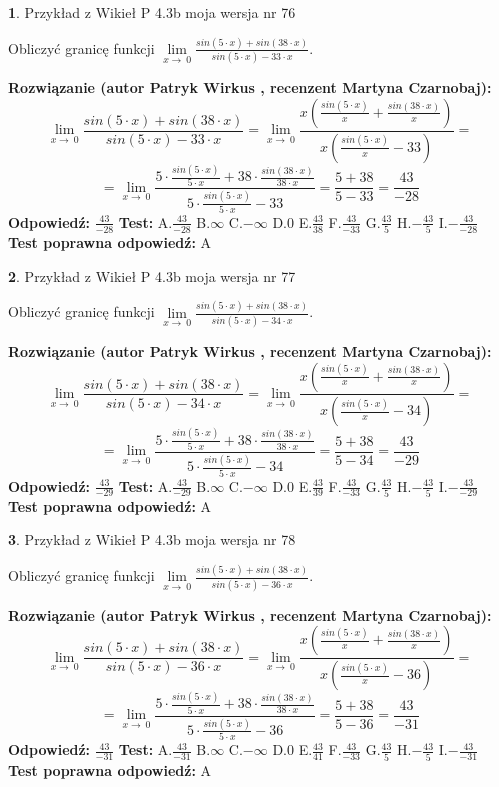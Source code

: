 \documentclass[12pt, a4paper]{article}
\theoremstyle{definition} %
\newtheorem{zad}{}
\newcommand{\zadStart}[1]{\begin{zad}#1\newline}
\newcommand{\zadStop}{\end{zad}}
\newcommand{\rozwStart}[2]{\noindent \textbf{Rozwiązanie (autor #1 , recenzent #2): }\newline}
\newcommand{\rozwStop}{\newline}
\newcommand{\odpStart}{\noindent \textbf{Odpowiedź:}\newline}
\newcommand{\odpStop}{\newline}
\newcommand{\testStart}{\noindent \textbf{Test:}\newline}
\newcommand{\testStop}{\newline}
\newcommand{\kluczStart}{\noindent \textbf{Test poprawna odpowiedź:}\newline}
\newcommand{\kluczStop}{\newline}
\begin{document}
\zadStart{Przykład z Wikieł P 4.3b moja wersja nr 76}


Obliczyć granicę funkcji $\lim\limits_{x\to\ 0}\frac{sin(5 \cdot x)+sin(38 \cdot x)}{sin(5 \cdot x)-33 \cdot x}$.
\zadStop
\rozwStart{Patryk Wirkus}{Martyna Czarnobaj}
$$\lim\limits_{x\to\ 0}\frac{sin(5 \cdot x)+sin(38 \cdot x)}{sin(5 \cdot x)-33 \cdot x}=\lim\limits_{x\to\ 0}\frac{x(\frac{sin(5 \cdot x)}{x}+\frac{sin(38 \cdot x)}{x})}{x(\frac{sin(5 \cdot x)}{x}-33)}=$$
$$=\lim\limits_{x\to\ 0}\frac{5 \cdot \frac{sin(5 \cdot x)}{5 \cdot x}+38 \cdot \frac{sin(38 \cdot x)}{38 \cdot x}}{5 \cdot \frac{sin(5 \cdot x)}{5 \cdot x}-33}=\frac{5+38}{5-33} = \frac{43}{-28}$$
\rozwStop
\odpStart
$\frac{43}{-28}$
\odpStop
\testStart
A.$\frac{43}{-28}$
B.$\infty$
C.$-\infty$
D.$0$
E.$\frac{43}{38}$
F.$\frac{43}{-33}$
G.$\frac{43}{5}$
H.$-\frac{43}{5}$
I.$-\frac{43}{-28}$
\testStop
\kluczStart
A
\kluczStop



\zadStart{Przykład z Wikieł P 4.3b moja wersja nr 77}


Obliczyć granicę funkcji $\lim\limits_{x\to\ 0}\frac{sin(5 \cdot x)+sin(38 \cdot x)}{sin(5 \cdot x)-34 \cdot x}$.
\zadStop
\rozwStart{Patryk Wirkus}{Martyna Czarnobaj}
$$\lim\limits_{x\to\ 0}\frac{sin(5 \cdot x)+sin(38 \cdot x)}{sin(5 \cdot x)-34 \cdot x}=\lim\limits_{x\to\ 0}\frac{x(\frac{sin(5 \cdot x)}{x}+\frac{sin(38 \cdot x)}{x})}{x(\frac{sin(5 \cdot x)}{x}-34)}=$$
$$=\lim\limits_{x\to\ 0}\frac{5 \cdot \frac{sin(5 \cdot x)}{5 \cdot x}+38 \cdot \frac{sin(38 \cdot x)}{38 \cdot x}}{5 \cdot \frac{sin(5 \cdot x)}{5 \cdot x}-34}=\frac{5+38}{5-34} = \frac{43}{-29}$$
\rozwStop
\odpStart
$\frac{43}{-29}$
\odpStop
\testStart
A.$\frac{43}{-29}$
B.$\infty$
C.$-\infty$
D.$0$
E.$\frac{43}{39}$
F.$\frac{43}{-33}$
G.$\frac{43}{5}$
H.$-\frac{43}{5}$
I.$-\frac{43}{-29}$
\testStop
\kluczStart
A
\kluczStop



\zadStart{Przykład z Wikieł P 4.3b moja wersja nr 78}


Obliczyć granicę funkcji $\lim\limits_{x\to\ 0}\frac{sin(5 \cdot x)+sin(38 \cdot x)}{sin(5 \cdot x)-36 \cdot x}$.
\zadStop
\rozwStart{Patryk Wirkus}{Martyna Czarnobaj}
$$\lim\limits_{x\to\ 0}\frac{sin(5 \cdot x)+sin(38 \cdot x)}{sin(5 \cdot x)-36 \cdot x}=\lim\limits_{x\to\ 0}\frac{x(\frac{sin(5 \cdot x)}{x}+\frac{sin(38 \cdot x)}{x})}{x(\frac{sin(5 \cdot x)}{x}-36)}=$$
$$=\lim\limits_{x\to\ 0}\frac{5 \cdot \frac{sin(5 \cdot x)}{5 \cdot x}+38 \cdot \frac{sin(38 \cdot x)}{38 \cdot x}}{5 \cdot \frac{sin(5 \cdot x)}{5 \cdot x}-36}=\frac{5+38}{5-36} = \frac{43}{-31}$$
\rozwStop
\odpStart
$\frac{43}{-31}$
\odpStop
\testStart
A.$\frac{43}{-31}$
B.$\infty$
C.$-\infty$
D.$0$
E.$\frac{43}{41}$
F.$\frac{43}{-33}$
G.$\frac{43}{5}$
H.$-\frac{43}{5}$
I.$-\frac{43}{-31}$
\testStop
\kluczStart
A
\kluczStop
\end{document}
